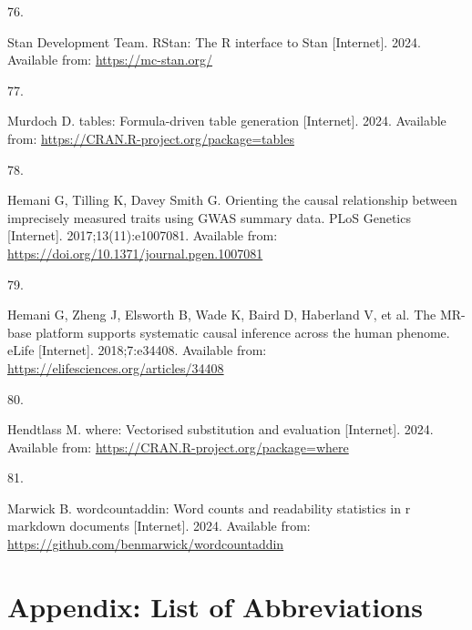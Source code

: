 \documentclass[
]{article}
\newlength{\cslhangindent}
\newlength{\csllabelwidth}
\newenvironment{CSLReferences}[2] %
 {\begin{list}{}{%
  \setlength{\itemindent}{0pt}
  \setlength{\leftmargin}{0pt}
  \setlength{\parsep}{0pt}
  \ifodd #1
   \setlength{\leftmargin}{\cslhangindent}
   \setlength{\itemindent}{-1\cslhangindent}
  \fi
  \setlength{\itemsep}{#2\baselineskip}}}
 {\end{list}}
\newcommand{\CSLLeftMargin}[1]{\parbox[t]{\csllabelwidth}{\strut#1\strut}}
\newcommand{\CSLRightInline}[1]{\parbox[t]{\linewidth - \csllabelwidth}{\strut#1\strut}}
\begin{document}
\begin{CSLReferences}{0}{1}
\CSLLeftMargin{76. }%
\CSLRightInline{Stan Development Team. {RStan}: The {R} interface to {Stan} {[}Internet{]}. 2024. Available from: \url{https://mc-stan.org/}}

\CSLLeftMargin{77. }%
\CSLRightInline{Murdoch D. {tables}: Formula-driven table generation {[}Internet{]}. 2024. Available from: \url{https://CRAN.R-project.org/package=tables}}

\CSLLeftMargin{78. }%
\CSLRightInline{Hemani G, Tilling K, Davey Smith G. Orienting the causal relationship between imprecisely measured traits using GWAS summary data. PLoS Genetics {[}Internet{]}. 2017;13(11):e1007081. Available from: \url{https://doi.org/10.1371/journal.pgen.1007081}}

\CSLLeftMargin{79. }%
\CSLRightInline{Hemani G, Zheng J, Elsworth B, Wade K, Baird D, Haberland V, et al. The MR-base platform supports systematic causal inference across the human phenome. eLife {[}Internet{]}. 2018;7:e34408. Available from: \url{https://elifesciences.org/articles/34408}}

\CSLLeftMargin{80. }%
\CSLRightInline{Hendtlass M. {where}: Vectorised substitution and evaluation {[}Internet{]}. 2024. Available from: \url{https://CRAN.R-project.org/package=where}}

\CSLLeftMargin{81. }%
\CSLRightInline{Marwick B. {wordcountaddin}: Word counts and readability statistics in r markdown documents {[}Internet{]}. 2024. Available from: \url{https://github.com/benmarwick/wordcountaddin}}

\end{CSLReferences}

\newpage

\appendix


\newpage

\section{Appendix: List of Abbreviations}\label{appendix-acr}
\end{document}
